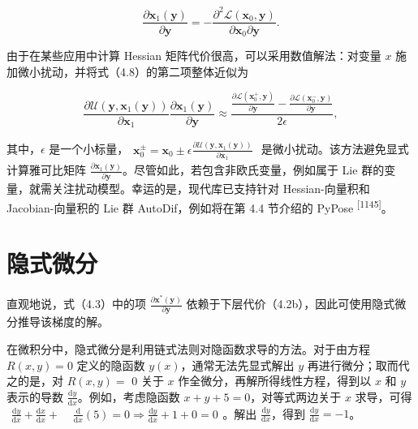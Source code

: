 \begin{equation}
\frac {\partial \boldsymbol {x} _ {1} (\boldsymbol {y})}{\partial \boldsymbol {y}} = - \frac {\partial^ {2} \mathcal {L} (\boldsymbol {x} _ {0} , \boldsymbol {y})}{\partial \boldsymbol {x} _ {0} \partial \boldsymbol {y}}.\tag{4.9}
\end{equation}

由于在某些应用中计算 Hessian 矩阵代价很高，可以采用数值解法：对变量 $x$ 施加微小扰动，并将式（4.8）的第二项整体近似为

\begin{equation}
\frac {\partial \mathcal {U} (\boldsymbol {y} , \boldsymbol {x} _ {1} (\boldsymbol {y}))}{\partial \boldsymbol {x} _ {1}} \frac {\partial \boldsymbol {x} _ {1} (\boldsymbol {y})}{\partial \boldsymbol {y}} \approx \frac {\frac {\partial \mathcal {L} (\boldsymbol {x} _ {0} ^ {+} , \boldsymbol {y})}{\partial \boldsymbol {y}} - \frac {\partial \mathcal {L} (\boldsymbol {x} _ {0} ^ {-} , \boldsymbol {y})}{\partial \boldsymbol {y}}}{2 \epsilon},\tag{4.10}
\end{equation}

其中，$\epsilon$ 是一个小标量，$\begin{array} { r } { \pmb { x } _ { 0 } ^ { \pm } = \pmb { x } _ { 0 } \pm \epsilon \frac { \partial \mathcal { U } ( \pmb { y } , \pmb { x } _ { 1 } ( \pmb { y } ) ) } { \partial \pmb { x } _ { 1 } } } \end{array}$ 是微小扰动。该方法避免显式计算雅可比矩阵 $\frac { \partial { \pmb x } _ { 1 } ( { \pmb y } ) } { \partial { \pmb y } }$。尽管如此，若包含非欧氏变量，例如属于 Lie 群的变量，就需关注扰动模型。幸运的是，现代库已支持针对 Hessian-向量积和 Jacobian-向量积的 Lie 群 AutoDif，例如将在第 4.4 节介绍的 PyPose \textsuperscript{[1145]}。

\section{隐式微分}

直观地说，式（4.3）中的项 $\frac { \partial \pmb { x } ^ { * } ( \pmb { y } ) } { \partial \pmb { y } }$ 依赖于下层代价（4.2b），因此可使用隐式微分推导该梯度的解。

在微积分中，隐式微分是利用链式法则对隐函数求导的方法。对于由方程 $R ( x , y ) = 0$ 定义的隐函数 $y ( x )$，通常无法先显式解出 $y$ 再进行微分；取而代之的是，对 $R ( x , y ) =$ 0 关于 $x$ 作全微分，再解所得线性方程，得到以 $x$ 和 $y$ 表示的导数 $\frac { \mathrm { d } y } { \mathrm { d } x }$。例如，考虑隐函数 $x + y + 5 = 0$，对等式两边关于 $x$ 求导，可得 $\begin{array} { r } { \frac { \mathrm { d } y } { \mathrm { d } x } + \frac { \mathrm { d } x } { \mathrm { d } x } + } \end{array}$ $\begin{array} { r } { \frac { \mathrm { d } } { \mathrm { d } x } ( 5 ) = 0 \Rightarrow \frac { \mathrm { d } y } { \mathrm { d } x } + 1 + 0 = 0 } \end{array}$。解出 $\frac { \mathrm { d } y } { \mathrm { d } x }$，得到 $\textstyle { \frac { \mathrm { d } y } { \mathrm { d } x } } = - 1$。

